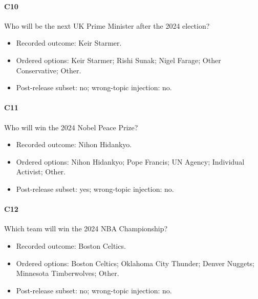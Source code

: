\paragraph*{C10} Who will be the next UK Prime Minister after the 2024 election?

\begin{itemize}

\item Recorded outcome: Keir Starmer.

\item Ordered options: Keir Starmer; Rishi Sunak; Nigel Farage; Other Conservative; Other.

\item Post-release subset: no; wrong-topic injection: no.

\end{itemize}

\paragraph*{C11} Who will win the 2024 Nobel Peace Prize?

\begin{itemize}

\item Recorded outcome: Nihon Hidankyo.

\item Ordered options: Nihon Hidankyo; Pope Francis; UN Agency; Individual Activist; Other.

\item Post-release subset: yes; wrong-topic injection: no.

\end{itemize}

\paragraph*{C12} Which team will win the 2024 NBA Championship?

\begin{itemize}

\item Recorded outcome: Boston Celtics.

\item Ordered options: Boston Celtics; Oklahoma City Thunder; Denver Nuggets; Minnesota Timberwolves; Other.

\item Post-release subset: no; wrong-topic injection: no.

\end{itemize}

